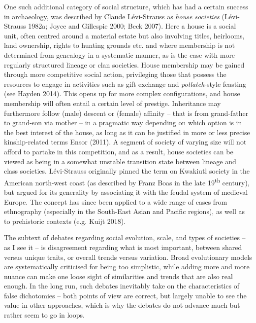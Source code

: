 \documentclass[
  12pt,
  a4paper, twoside]{book}
\begin{document}
One such additional category of social structure, which has had a certain success in archaeology, was described by Claude Lévi-Strauss as \emph{house societies} (Lévi-Strauss 1982a; Joyce and Gillespie 2000; Beck 2007). Here a house is a social unit, often centred around a material estate but also involving titles, heirlooms, land ownership, rights to hunting grounds etc. and where membership is not determined from genealogy in a systematic manner, as is the case with more regularly structured lineage or clan societies. House membership may be gained through more competitive social action, privileging those that possess the resources to engage in activities such as gift exchange and \emph{potlatch}-style feasting (see Hayden 2014). This opens up for more complex configurations, and house membership will often entail a certain level of prestige. Inheritance may furthermore follow (male) descent or (female) affinity -- that is from grand-father to grand-son via mother -- in a pragmatic way depending on which option is in the best interest of the house, as long as it can be justified in more or less precise kinship-related terms Ensor (2011). A segment of society of varying size will not afford to partake in this competition, and as a result, house societies can be viewed as being in a somewhat unstable transition state between lineage and class societies. Lévi-Strauss originally pinned the term on Kwakiutl society in the American north-west coast (as described by Franz Boas in the late 19\textsuperscript{th} century), but argued for its generality by associating it with the feudal system of medieval Europe. The concept has since been applied to a wide range of cases from ethnography (especially in the South-East Asian and Pacific regions), as well as to prehistoric contexts (e.g. Kuijt 2018).

The subtext of debates regarding social evolution, scale, and types of societies -- as I see it -- is disagreement regarding what is most important, between shared versus unique traits, or overall trends versus variation. Broad evolutionary models are systematically criticised for being too simplistic, while adding more and more nuance can make one loose sight of similarities and trends that are also real enough. In the long run, such debates inevitably take on the characteristics of false dichotomies -- both points of view are correct, but largely unable to see the value in other approaches, which is why the debates do not advance much but rather seem to go in loops.
\end{document}
